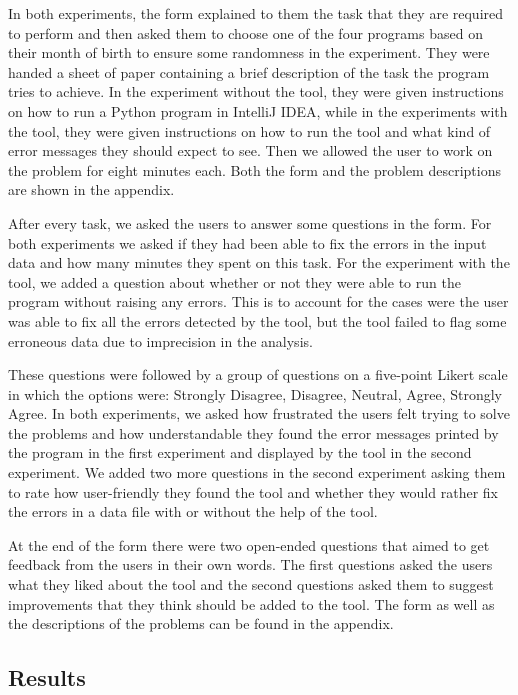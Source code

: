 \documentclass[10pt]{report}
\begin{document}
In both experiments, the form explained to them the task that they are required to perform and then asked them to choose one of the four programs based on their month of birth to ensure some randomness in the experiment. They were handed a sheet of paper containing a brief description of the task the program tries to achieve. In the experiment without the tool, they were given instructions on how to run a Python program in IntelliJ IDEA, while in the experiments with the tool, they were given instructions on how to run the tool and what kind of error messages they should expect to see. Then we allowed the user to work on the problem for eight minutes each. Both the form and the problem descriptions are shown in the appendix. 

After every task, we asked the users to answer some questions in the form.  For both experiments we asked if they had been able to fix the errors in the input data and how many minutes they spent on this task. For the experiment with the tool, we added a question about whether or not they were able to run the program without raising any errors. This is to account for the cases were the user was able to fix all the errors detected by the tool, but the tool failed to flag some erroneous data due to imprecision in the analysis.  

These questions were followed by a group of questions on a five-point Likert scale in which the options were: Strongly Disagree, Disagree, Neutral, Agree, Strongly Agree. In both experiments, we asked how frustrated the users felt trying to solve the problems and how understandable they found the error messages printed by the program in the first experiment and displayed by the tool in the second experiment. We added two more questions in the second experiment asking them to rate how user-friendly they found the tool and whether they would rather fix the errors in a data file with or without the help of the tool. 

At the end of the form there were two open-ended questions that aimed to get feedback from the users in their own words. The first questions asked the users what they liked about the tool and the second questions asked them to suggest improvements that they think should be added to the tool. The form as well as the descriptions of the problems can be found in the appendix. 

\subsection{Results} \label{results}
\end{document}
